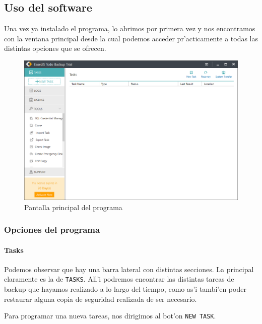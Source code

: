 \documentclass[11pt]{article}
\begin{document}
	\subsection{Uso del software}
	
	Una vez ya instalado el programa, lo abrimos por primera vez y nos encontramos con la ventana principal desde la cual podemos acceder pr'acticamente a todas las distintas opciones que se ofrecen.
	
	\begin{figure}[H]
		\centering
		\includegraphics[width=.8\textwidth]{Images/easeus/use_main}
		\caption{Pantalla principal del programa}
	\end{figure}
	
	\subsubsection{Opciones del programa}
	
	\paragraph{Tasks}
	
	Podemos observar que hay una barra lateral con distintas secciones. La principal claramente es la de \texttt{TASKS}. All'i podremos encontrar las distintas tareas de backup que hayamos realizado a lo largo del tiempo, como as'i tambi'en poder restaurar alguna copia de seguridad realizada de ser necesario.
	
	Para programar una nueva tareas, nos dirigimos al bot'on \texttt{NEW TASK}.
	
\end{document}
